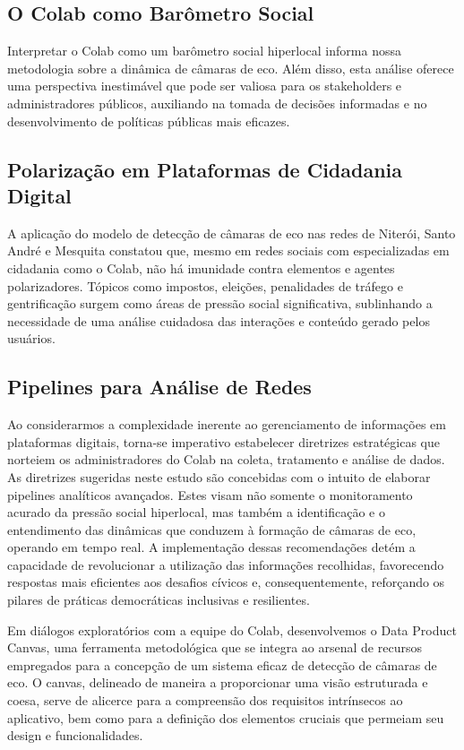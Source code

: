 \subsection*{O Colab como Barômetro Social}

Interpretar o Colab como um barômetro social hiperlocal informa nossa metodologia sobre a dinâmica de câmaras de eco. Além disso, esta análise oferece uma perspectiva inestimável que pode ser valiosa para os stakeholders e administradores públicos, auxiliando na tomada de decisões informadas e no desenvolvimento de políticas públicas mais eficazes.

\subsection*{Polarização em Plataformas de Cidadania Digital}

A aplicação do modelo de detecção de câmaras de eco nas redes de Niterói, Santo André e Mesquita constatou que, mesmo em redes sociais com especializadas em cidadania como o Colab, não há imunidade contra elementos e agentes polarizadores. Tópicos como impostos, eleições, penalidades de tráfego e gentrificação surgem como áreas de pressão social significativa, sublinhando a necessidade de uma análise cuidadosa das interações e conteúdo gerado pelos usuários.

\subsection*{Pipelines para Análise de Redes}

Ao considerarmos a complexidade inerente ao gerenciamento de informações em plataformas digitais, torna-se imperativo estabelecer diretrizes estratégicas que norteiem os administradores do Colab na coleta, tratamento e análise de dados. As diretrizes sugeridas neste estudo são concebidas com o intuito de elaborar pipelines analíticos avançados. Estes visam não somente o monitoramento acurado da pressão social hiperlocal, mas também a identificação e o entendimento das dinâmicas que conduzem à formação de câmaras de eco, operando em tempo real. A implementação dessas recomendações detém a capacidade de revolucionar a utilização das informações recolhidas, favorecendo respostas mais eficientes aos desafios cívicos e, consequentemente, reforçando os pilares de práticas democráticas inclusivas e resilientes.

Em diálogos exploratórios com a equipe do Colab, desenvolvemos o Data Product Canvas, uma ferramenta metodológica que se integra ao arsenal de recursos empregados para a concepção de um sistema eficaz de detecção de câmaras de eco. O canvas, delineado de maneira a proporcionar uma visão estruturada e coesa, serve de alicerce para a compreensão dos requisitos intrínsecos ao aplicativo, bem como para a definição dos elementos cruciais que permeiam seu design e funcionalidades.

